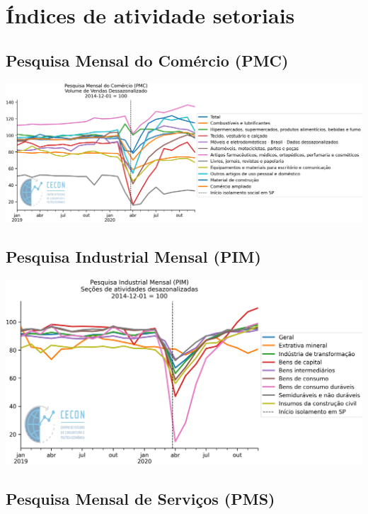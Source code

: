\documentclass{SelfArx}
\begin{document}
\section*{Índices de atividade setoriais}
\label{sec:org543ce81}


\subsection*{Pesquisa Mensal do Comércio (PMC)}
\label{sec:org8af1d09}

\begin{center}
\includegraphics[width=.9\linewidth]{./figs/Setoriais/PMC_IBGE.png}
\end{center}


\subsection*{Pesquisa Industrial Mensal (PIM)}
\label{sec:org16c12f8}

\begin{center}
\includegraphics[width=.9\linewidth]{./figs/Setoriais/PIM_IBGE.png}
\end{center}


\subsection*{Pesquisa Mensal de Serviços (PMS)}
\label{sec:org2edeccc}
\end{document}
